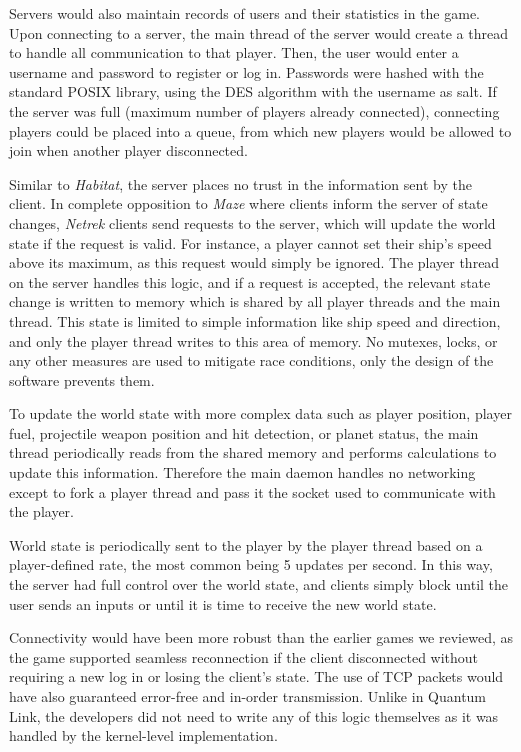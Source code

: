 Servers would also maintain records of users and their statistics in the game. Upon connecting to a server, the main thread of the server would create a thread to handle all communication to that player. Then, the user would enter a username and password to register or log in. Passwords were hashed with the standard POSIX  library, using the DES algorithm with the username as salt. If the server was full (maximum number of players already connected), connecting players could be placed into a queue, from which new players would be allowed to join when another player disconnected.

Similar to \textit{Habitat}, the server places no trust in the information sent by the client. In complete opposition to \textit{Maze} where clients inform the server of state changes, \textit{Netrek} clients send requests to the server, which will update the world state if the request is valid. For instance, a player cannot set their ship's speed above its maximum, as this request would simply be ignored. The player thread on the server handles this logic, and if a request is accepted, the relevant state change is written to memory which is shared by all player threads and the main thread. This state is limited to simple information like ship speed and direction, and only the player thread writes to this area of memory. No mutexes, locks, or any other measures are used to mitigate race conditions, only the design of the software prevents them.

To update the world state with more complex data such as player position, player fuel, projectile weapon position and hit detection, or planet status, the main thread periodically reads from the shared memory and performs calculations to update this information. Therefore the main daemon handles no networking except to fork a player thread and pass it the socket used to communicate with the player.

World state is periodically sent to the player by the player thread based on a player-defined rate, the most common being 5 updates per second. In this way, the server had full control over the world state, and clients simply block until the user sends an inputs or until it is time to receive the new world state.

Connectivity would have been more robust than the earlier games we reviewed, as the game supported seamless reconnection if the client disconnected without requiring a new log in or losing the client's state. The use of TCP packets would have also guaranteed error-free and in-order transmission. Unlike in Quantum Link, the developers did not need to write any of this logic themselves as it was handled by the kernel-level implementation.

